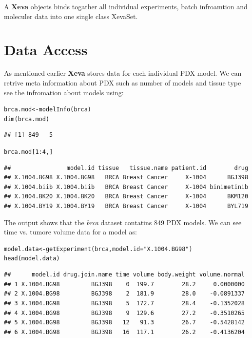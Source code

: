 \documentclass{article}\usepackage[]{graphicx}\usepackage[usenames,dvipsnames]{color}
\newcommand{\hlnum}[1]{\textcolor[rgb]{0.816,0.125,0.439}{#1}}%
\newcommand{\hlstr}[1]{\textcolor[rgb]{0.251,0.627,0.251}{#1}}%
\newcommand{\hlopt}[1]{\textcolor[rgb]{0,0,0}{#1}}%
\newcommand{\hlstd}[1]{\textcolor[rgb]{0.251,0.251,0.251}{#1}}%
\newcommand{\hlkwb}[1]{\textcolor[rgb]{0,0,0}{#1}}%
\newcommand{\hlkwc}[1]{\textcolor[rgb]{0.251,0.251,0.251}{#1}}%
\newcommand{\hlkwd}[1]{\textcolor[rgb]{0.878,0.439,0.125}{#1}}%
\newenvironment{knitrout}{}{} %
\begin{document}
A \textbf{Xeva} objects binds togather all individual experiments, batch infroamtion and moleculer data into one single class XevaSet.


\section{Data Access}
As mentioned earlier \textbf{Xeva} stores data for each individual PDX model.
We can retrive meta information about PDX  such as number of models and tissue type see the infromation about models using:
\begin{knitrout}
\color{fgcolor}\begin{kframe}
\begin{alltt}
\hlstd{brca.mod} \hlkwb{<-} \hlkwd{modelInfo}\hlstd{(brca)}
\hlkwd{dim}\hlstd{(brca.mod)}
\end{alltt}
\begin{verbatim}
## [1] 849   5
\end{verbatim}
\begin{alltt}
\hlstd{brca.mod[}\hlnum{1}\hlopt{:}\hlnum{4}\hlstd{, ]}
\end{alltt}
\begin{verbatim}
##                model.id tissue   tissue.name patient.id        drug
## X.1004.BG98 X.1004.BG98   BRCA Breast Cancer     X-1004      BGJ398
## X.1004.biib X.1004.biib   BRCA Breast Cancer     X-1004 binimetinib
## X.1004.BK20 X.1004.BK20   BRCA Breast Cancer     X-1004      BKM120
## X.1004.BY19 X.1004.BY19   BRCA Breast Cancer     X-1004      BYL719
\end{verbatim}
\end{kframe}
\end{knitrout}
The output shows that the \textit{brca} dataset contatins 849 PDX models.
We can see time vs. tumore volume data for a model as:

\begin{knitrout}
\color{fgcolor}\begin{kframe}
\begin{alltt}
\hlstd{model.data} \hlkwb{<-} \hlkwd{getExperiment}\hlstd{(brca,} \hlkwc{model.id} \hlstd{=} \hlstr{"X.1004.BG98"}\hlstd{)}
\hlkwd{head}\hlstd{(model.data)}
\end{alltt}
\begin{verbatim}
##      model.id drug.join.name time volume body.weight volume.normal
## 1 X.1004.BG98         BGJ398    0  199.7        28.2     0.0000000
## 2 X.1004.BG98         BGJ398    2  181.9        28.0    -0.0891337
## 3 X.1004.BG98         BGJ398    5  172.7        28.4    -0.1352028
## 4 X.1004.BG98         BGJ398    9  129.6        27.2    -0.3510265
## 5 X.1004.BG98         BGJ398   12   91.3        26.7    -0.5428142
## 6 X.1004.BG98         BGJ398   16  117.1        26.2    -0.4136204
\end{verbatim}
\end{kframe}
\end{knitrout}
\end{document}
